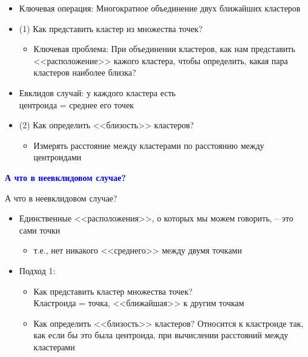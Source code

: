 \documentclass[landscape]{slides}
\begin{document}
\begin{normalsize}
\begin{slide}
\begin{itemize}
\item Ключевая операция: Многократное объединение двух ближайших кластеров
\item (1) Как представить кластер из множества точек?
  \begin{itemize}
  \item Ключевая проблема: При объединении кластеров, как нам представить <<расположение>> кажого кластера, чтобы определить, какая пара кластеров наиболее близка?
  \end{itemize}
\item Евклидов случай: у каждого кластера есть \\
центроида = среднее его точек
\item (2) Как определить <<близость>> кластеров?
  \begin{itemize}
  \item Измерять расстояние между кластерами по расстоянию между центроидами
  \end{itemize}
\end{itemize}
\end{slide}



\begin{slide}
\textbf{\textcolor{blue}{А что в неевклидовом случае?}}

А что в неевклидовом случае?

\begin{itemize}
\item Единственные <<расположения>>, о которых мы можем говорить, -- это сами точки
  \begin{itemize}
  \item т.е., нет никакого <<среднего>> между двумя точками
  \end{itemize}
\item Подход 1:
  \begin{itemize}
  \item Как представить кластер множества точек?\\
  Кластроида = точка, <<ближайшая>> к другим точкам
  \item Как определить <<близость>> кластеров?
  Относится к кластроиде так, как если бы это была центроида,
  при вычислении расстояний между кластерами
  \end{itemize}
\end{itemize}
\end{slide}




\end{normalsize}
\end{document}
